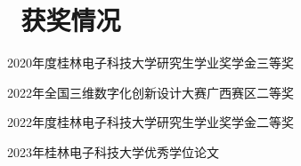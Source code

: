 \documentclass[a4paper,11pt]{ctexart}
\begin{document}

\section{\texorpdfstring{\faTrophy\,}{} 获奖情况}

\resumeItemListStart
  \item 2020年度桂林电子科技大学研究生学业奖学金三等奖
  \item 2022年全国三维数字化创新设计大赛广西赛区二等奖
  \item 2022年度桂林电子科技大学研究生学业奖学金二等奖
  \item 2023年桂林电子科技大学优秀学位论文
\resumeItemListEnd
\vspace{-4mm}





\end{document}
